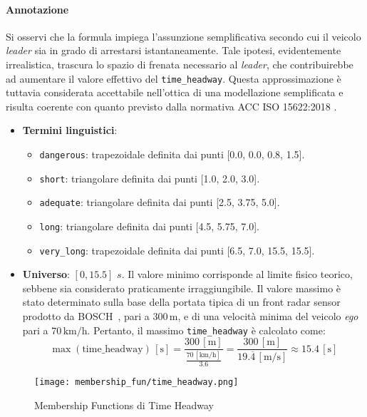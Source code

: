 \paragraph{Annotazione} Si osservi che la formula impiega l'assunzione semplificativa 
secondo cui il veicolo \emph{leader} sia in grado di arrestarsi istantaneamente. 
Tale ipotesi, evidentemente irrealistica, trascura lo spazio di frenata necessario al \emph{leader}, 
che contribuirebbe ad aumentare il valore effettivo del \texttt{time\_headway}. Questa approssimazione 
è tuttavia considerata accettabile nell'ottica di una modellazione semplificata e risulta coerente con quanto 
previsto dalla normativa ACC ISO 15622:2018 \cite{iso15622}.

\begin{itemize}
  \item \textbf{Termini linguistici}:
    \begin{itemize}
      \item \texttt{dangerous}: trapezoidale definita dai punti [0.0, 0.0, 0.8, 1.5].
      \item \texttt{short}: triangolare definita dai punti [1.0, 2.0, 3.0].
      \item \texttt{adequate}: triangolare definita dai punti [2.5, 3.75, 5.0].
      \item \texttt{long}: triangolare definita dai punti [4.5, 5.75, 7.0].
      \item \texttt{very\_long}: trapezoidale definita dai punti [6.5, 7.0, 15.5, 15.5].
    \end{itemize}
  \item \textbf{Universo}: \([0,15.5]\) $s$.  
        Il valore minimo corrisponde al limite fisico teorico, sebbene sia considerato praticamente irraggiungibile.
        Il valore massimo è stato determinato sulla base della portata tipica di un front radar sensor prodotto da BOSCH~\cite{bosch_radar}, pari a \(300\,\mathrm{m}\), e di una velocità minima del veicolo \emph{ego} pari a \(70\,\mathrm{km/h}\).  
        Pertanto, il massimo \texttt{time\_headway} è calcolato come:
        \[
            \max(\text{time\_headway})\,[\mathrm{s}] =
            \frac{300 \,[\mathrm{m}]}{\frac{70\,[\mathrm{km}/\mathrm{h}]}{3.6}} = 
            \frac{300 \,[\mathrm{m}]}{19.\overline{4}\,[\mathrm{m}/\mathrm{s}]}
            \approx 15.4\,[\mathrm{s}]
        \]
\end{itemize}

\begin{figure}[H]
    \centering
    \texttt{[image: membership\_fun/time\_headway.png]}
    \caption{Membership Functions di Time Headway}
    \label{Fig:mf_time_headway}
\end{figure}

